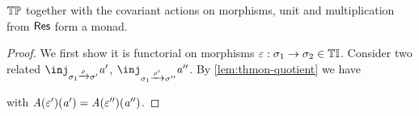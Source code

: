 \begin{lemma}
    ${\mathbb{T}{\mathbb{P}}}$ together with the covariant actions on morphisms, unit and multiplication from $\mathsf{Res}\relax$ form a monad.
\end{lemma}
\begin{proof}
    \nl
    We first show it is functorial on morphisms $\varepsilon : \sigma_1 \to \sigma_2 \in {\mathbb{T}\mathbb{I}}$.
    Consider two related $\inj_{\sigma_1 \xto\rho \sigma'} \va'$, $\inj_{\sigma_1 \xto{\rho'} \sigma''} \va''$. 
    By \cref{lem:thmon-quotient} we have
    with $\mathit{A}(\varepsilon')(\mathit{a}') = \mathit{A}(\varepsilon'')(\mathit{a}'')$.


\end{proof}

